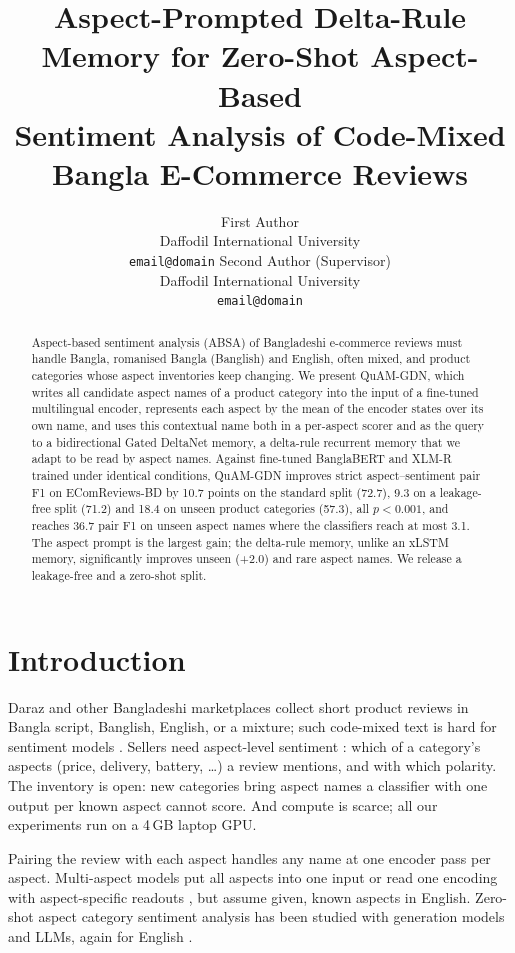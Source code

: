 \documentclass[11pt]{article}
\title{Aspect-Prompted Delta-Rule Memory for Zero-Shot Aspect-Based\\
Sentiment Analysis of Code-Mixed Bangla E-Commerce Reviews}
\author{First Author \\ Daffodil International University \\ \texttt{email@domain} \And
        Second Author (Supervisor) \\ Daffodil International University \\ \texttt{email@domain}}
\newcommand{\quam}{QuAM-GDN}
\begin{document}
\maketitle

\begin{abstract}
Aspect-based sentiment analysis (ABSA) of Bangladeshi e-commerce reviews must handle Bangla, romanised
Bangla (Banglish) and English, often mixed, and product categories whose aspect inventories keep
changing. We present \quam{}, which writes all candidate aspect names of a product category into the
input of a fine-tuned multilingual encoder, represents each aspect by the mean of the encoder states
over its own name, and uses this contextual name both in a per-aspect scorer and as the query to a
bidirectional Gated DeltaNet memory, a delta-rule recurrent memory that we adapt to be read by aspect
names. Against fine-tuned BanglaBERT and XLM-R trained under identical conditions, \quam{} improves
strict aspect--sentiment pair F1 on EComReviews-BD by 10.7 points on the standard split (72.7), 9.3 on
a leakage-free split (71.2) and 18.4 on unseen product categories (57.3), all $p<0.001$, and reaches
36.7 pair F1 on unseen aspect names where the classifiers reach at most 3.1. The aspect prompt is the
largest gain; the delta-rule memory, unlike an xLSTM memory, significantly improves unseen (+2.0) and
rare aspect names. We release a leakage-free and a zero-shot split.
\end{abstract}

\section{Introduction}

Daraz and other Bangladeshi marketplaces collect short product reviews in Bangla script, Banglish,
English, or a mixture; such code-mixed text is hard for sentiment models \citep{patwa2020sentimix}.
Sellers need aspect-level sentiment \citep{pontiki2014semeval,zhang2023absasurvey}: which of a
category's aspects (price, delivery, battery, \dots) a review mentions, and with which polarity. The
inventory is open: new categories bring aspect names a classifier with one output per known aspect
cannot score. And compute is scarce; all our experiments run on a 4\,GB laptop GPU.

Pairing the review with each aspect \citep{sun2019auxiliary} handles any name at one encoder pass per
aspect. Multi-aspect models put all aspects into one input \citep{wu2020tmm} or read one encoding with
aspect-specific readouts \citep{xia2026dabs}, but assume given, known aspects in English. Zero-shot
aspect category sentiment analysis has been studied with generation models and LLMs, again for English
\citep{liu2021acsagen,ventirozos2025zeroshotacsa}.
\end{document}
